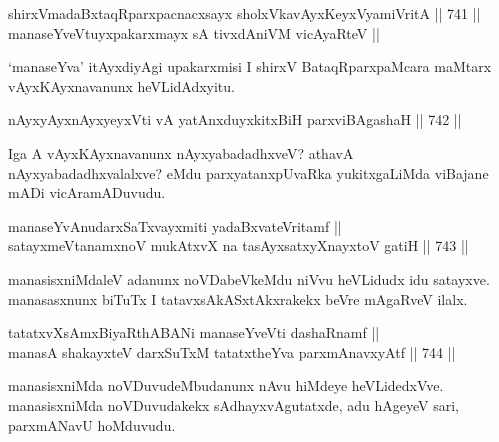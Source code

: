 
\begin{shl}
shirxVmadaBxtaqRparxpacnacxsayx sholxVkavAyxKeyxVyamiVritA \hfill || 741 ||  \\
manaseYveVtuyxpakarxmayx sA tivxdAniVM vicAyaRteV ||
\end{shl}

\begin{artha} 
`manaseYva' itAyxdiyAgi upakarxmisi I shirxV BataqRparxpaMcara maMtarx vAyxKAyxnavanunx heVLidAdxyitu.
\end{artha}


\begin{shl}
nAyxyAyx\s nAyxyeyxVti vA yatAnxduyxkitxBiH parxviBAgashaH \hfill || 742 ||  
\end{shl}

\begin{artha} 
Iga A vAyxKAyxnavanunx nAyxyabadadhxveV? athavA nAyxyabadadhxvalalxve? eMdu parxyatanxpUvaRka yukitxgaLiMda viBajane mADi vicAramADuvudu.
\end{artha}


\begin{shl}
manaseYvAnudarxSaTxvayxmiti yadaBxvateVritamf || \\
satayxmeVtanamxnoV mukAtxvX na tasAyxsatxyXnayxtoV gatiH \hfill || 743 ||  
\end{shl}

\begin{artha} 
manasisxniMdaleV adanunx noVDabeVkeMdu niVvu heVLidudx idu satayxve. manasasxnunx biTuTx I tatavxsAkASxtAkxrakekx beVre mAgaRveV ilalx.
\end{artha}

\begin{shl}
tatatxvXsAmxBiyaRthA\s BANi manaseYveVti dashaRnamf || \\
manasA shakayxteV darxSuTxM tatatxtheYva parxmAnavxyAtf \hfill || 744 ||  
\end{shl}	

\begin{artha} 
manasisxniMda noVDuvudeMbudanunx nAvu hiMdeye heVLidedxVve. manasisxniMda noVDuvudakekx sAdhayxvAgutatxde, adu hAgeyeV sari, parxmANavU hoMduvudu.
\end{artha}


